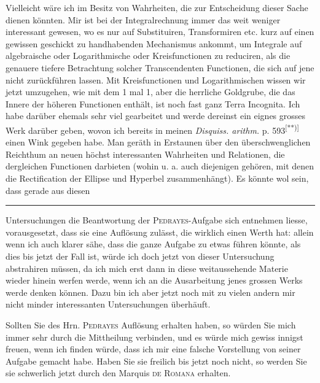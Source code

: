 \par\indent Vielleicht wäre ich im Besitz von Wahrheiten, die zur Entscheidung dieser Sache dienen könnten. Mir ist bei der Integralrechnung immer das weit weniger interessant gewesen, wo es nur auf Substituiren, Transformiren etc. kurz auf einen gewissen geschickt zu handhabenden Mechanismus ankommt, um Integrale auf algebraische oder Logarithmische oder Kreisfunctionen zu reduciren, als die genauere tiefere Betrachtung solcher Transcendenten Functionen, die sich auf jene nicht zurückführen lassen. Mit Kreisfunctionen und Logarithmischen wissen wir jetzt umzugehen, wie mit dem 1 mal 1, aber die herrliche Goldgrube, die das Innere der höheren Functionen enthält, ist noch fast ganz Terra Incognita. Ich habe darüber ehemals sehr viel gearbeitet und werde dereinst ein eignes grosses Werk darüber geben, wovon ich bereits in meinen \textit{Disquiss. arithm.} p. 593\textsuperscript{[**)]} einen Wink gegeben habe. Man geräth in Erstaunen über den überschwenglichen Reichthum an neuen höchst interessanten Wahrheiten und Relationen, die dergleichen Functionen darbieten (wohin u. a. auch diejenigen gehören, mit denen die Rectification der Ellipse und Hyperbel zusammenhängt). Es könnte wol sein, dass gerade aus diesen
\par\vfill\noindent\rule{.25\linewidth}{.4pt}\par\smallskip
\begingroup\footnotesize
\noindent [*) Die Handschrift hat $xx+yy=1$; in der Aufgabe des \textsc{Pedrayes} heissen die beiden Veränderlichen $x$ und $u$.]\par
{}\par\endgroup
\clearpage
{}
\noindent Untersuchungen die Beantwortung der \textsc{Pedrayes}-Aufgabe sich entnehmen liesse, vorausgesetzt, dass sie eine Auflösung zulässt, die wirklich einen Werth hat: allein wenn ich auch klarer sähe, dass die ganze Aufgabe zu etwas führen könnte, als dies bis jetzt der Fall ist, würde ich doch jetzt von dieser Untersuchung abstrahiren müssen, da ich mich erst dann in diese weitaussehende Materie wieder hinein werfen werde, wenn ich an die Ausarbeitung jenes grossen Werks werde denken können. Dazu bin ich aber jetzt noch mit zu vielen andern mir nicht minder interessanten Untersuchungen überhäuft.

\par\indent Sollten Sie des Hrn. \textsc{Pedrayes} Auflösung erhalten haben, so würden Sie mich immer sehr durch die Mittheilung verbinden, und es würde mich gewiss innigst freuen, wenn ich finden würde, dass ich mir eine falsche Vorstellung von seiner Aufgabe gemacht habe. Haben Sie sie freilich bis jetzt noch nicht, so werden Sie sie schwerlich jetzt durch den Marquis \textsc{de Romana} erhalten.

